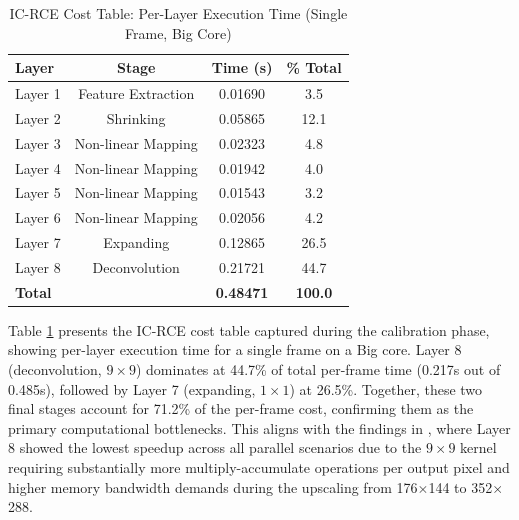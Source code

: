 \documentclass[conference]{IEEEtran}
\begin{document}
\begin{table}[htbp]
\caption{IC-RCE Cost Table: Per-Layer Execution Time (Single Frame, Big Core)}
\begin{center}
\small
\begin{tabular}{|l|c|c|c|}
\hline
\textbf{Layer} & \textbf{Stage} & \textbf{Time (s)} & \textbf{\% Total} \\
\hline
Layer 1 & Feature Extraction & 0.01690 & 3.5 \\
Layer 2 & Shrinking & 0.05865 & 12.1 \\
Layer 3 & Non-linear Mapping & 0.02323 & 4.8 \\
Layer 4 & Non-linear Mapping & 0.01942 & 4.0 \\
Layer 5 & Non-linear Mapping & 0.01543 & 3.2 \\
Layer 6 & Non-linear Mapping & 0.02056 & 4.2 \\
Layer 7 & Expanding & 0.12865 & 26.5 \\
Layer 8 & Deconvolution & 0.21721 & 44.7 \\
\hline
\textbf{Total} & & \textbf{0.48471} & \textbf{100.0} \\
\hline
\end{tabular}
\label{tab:layers}
\end{center}
\end{table}


Table \ref{tab:layers} presents the IC-RCE cost table captured during the calibration phase, showing per-layer execution time for a single frame on a Big core. Layer 8 (deconvolution, $9\times9$) dominates at 44.7\% of total per-frame time (0.217s out of 0.485s), followed by Layer 7 (expanding, $1\times1$) at 26.5\%. Together, these two final stages account for 71.2\% of the per-frame cost, confirming them as the primary computational bottlenecks. This aligns with the findings in \cite{annisa2025fsrcnn}, where Layer 8 showed the lowest speedup across all parallel scenarios due to the $9\times9$ kernel requiring substantially more multiply-accumulate operations per output pixel and higher memory bandwidth demands during the upscaling from 176$\times$144 to 352$\times$288.
\end{document}

